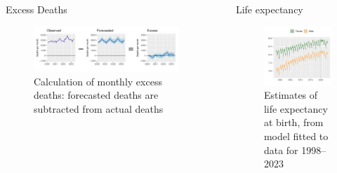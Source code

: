 \documentclass[final]{beamer}
\newlength{\sepwid}
\newlength{\onecolwid}
\newlength{\twocolwid}
\begin{document}
\begin{frame}[t]
\begin{columns}[t]
\begin{column}{\twocolwid}
\begin{alertblock}{Excess Deaths}
\begin{figure}
\includegraphics[width = \linewidth]{fig_calc_excess}
\caption{Calculation of monthly excess deaths: forecasted deaths are subtracted from actual deaths}
\end{figure}

\end{alertblock} 

\end{column} %

\begin{column}{\sepwid}\end{column} %

\begin{column}{\onecolwid} %

\begin{block}{Life expectancy}
\begin{figure}
\includegraphics[width = 0.95\linewidth]{fig_lifeexp}
\caption{Estimates of life expectancy at birth, from model fitted to data for 1998--2023}
\end{figure}
\end{block}


\end{column}
\end{columns}
\end{frame}
\end{document}

